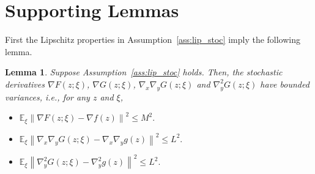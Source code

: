 \documentclass{osudissert96}
\newtheorem{lemma}{Lemma}
\begin{document}


%
%
%

\section{Supporting Lemmas}
 First  the Lipschitz properties in Assumption~\ref{ass:lip_stoc} imply the following lemma.
\begin{lemma}\label{le:boundv}
Suppose Assumption~\ref{ass:lip_stoc} holds. Then, the stochastic derivatives $\nabla F(z;\xi)$, $\nabla G(z;\xi)$, $\nabla_x\nabla_y G(z;\xi)$ and $\nabla_y^2 G(z;\xi)$ have bounded variances, i.e., for any $z$ and $\xi$, 
\begin{itemize}
\item $\mathbb{E}_\xi\left \|\nabla F(z;\xi)-\nabla f(z)\right\|^2 \leq M^2.$
\item $\mathbb{E}_\xi\left \|\nabla_x\nabla_y G(z;\xi)-\nabla_x\nabla_y g(z)\right\|^2 \leq L^2.$
\item $\mathbb{E}_\xi \left\|\nabla_y^2 G(z;\xi)-\nabla_y^2 g(z)\right\|^2 \leq L^2.$
\end{itemize}
\end{lemma}
\end{document}
